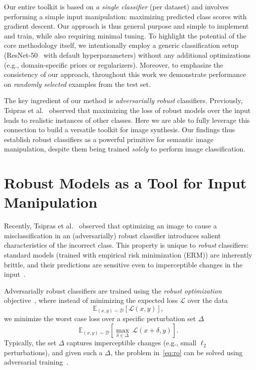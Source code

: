 \documentclass{article}
\newcommand{\D}{\mathcal{D}}
\newcommand{\loss}{\mathcal{L}}
\newcommand{\E}{\mathbb{E}}
\begin{document}
Our entire toolkit is based on {\em a single classifier} (per dataset)
and involves performing a simple input
manipulation: maximizing predicted class scores with gradient descent.
Our approach is thus general purpose and simple to implement and train, 
while also requiring minimal tuning.
To highlight the potential of the core methodology itself, 
we intentionally employ a generic classification setup
(ResNet-50~\cite{he2016deep} with default hyperparameters) without any
additional optimizations (e.g., domain-specific priors or regularizers).
Moreover, to emphasize the consistency of our approach,
throughout this work we demonstrate performance on {\em randomly selected}
examples from the test set.

The key ingredient of our method is {\em
adversarially robust} classifiers.
Previously, Tsipras et al.~\cite{tsipras2019robustness} observed that maximizing
the loss of  robust models over the input leads to realistic
instances of other classes.
Here we are able to fully leverage this connection to build a versatile toolkit
for image synthesis.
Our findings thus establish robust classifiers as a powerful primitive
for semantic image manipulation, despite them being trained {\em solely} to perform image 
classification.
 
\section{Robust Models as a Tool for Input Manipulation}
\label{sec:grad}
Recently, Tsipras et al.~\cite{tsipras2019robustness} observed 
that optimizing an image to cause a misclassification in an (adversarially)
robust classifier introduces salient characteristics of the 
incorrect class.  This property is unique to {\em robust} classifiers: 
standard models (trained with empirical risk minimization (ERM)) are 
inherently brittle, and their predictions are sensitive even to 
imperceptible changes in the input~\cite{szegedy2014intriguing}.

Adversarially robust classifiers are trained using the {\em robust 
optimization} objective~\cite{wald1945statistical,madry2018towards}, where instead of
minimizing the expected loss $\loss$ over the data
\begin{equation}
\E_{(x,y)\sim\D} \left[\loss(x,y)\right],
\end{equation}
we minimize the worst case loss over a specific perturbation 
set $\Delta$
\begin{equation}
\E_{(x,y)\sim\D} \left[\max_{\delta\in\Delta}\ \loss(x+\delta,y)\right].
\label{eq:ro}
\end{equation}
Typically, the set $\Delta$ captures
imperceptible changes (e.g., small $\ell_2$ perturbations), 
and given such a $\Delta$, the problem in~\eqref{eq:ro} can be solved using adversarial 
training~\cite{goodfellow2015explaining,madry2018towards}.
\end{document}
